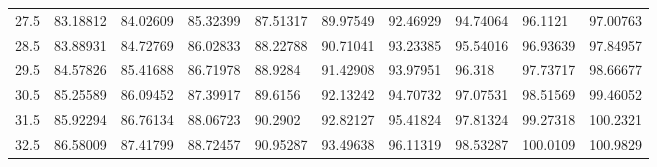 \documentclass[10pt,twocolumn,letterpaper]{article}
\begin{document}
\begin{table}
\begin{tabular}{llllllllll}
    27.5            & 83.18812                               & 84.02609                               & 85.32399                                & 87.51317                                & 89.97549                                & 92.46929                                & 94.74064                                & 96.1121                                 & 97.00763                                \\
    28.5            & 83.88931                               & 84.72769                               & 86.02833                                & 88.22788                                & 90.71041                                & 93.23385                                & 95.54016                                & 96.93639                                & 97.84957                                \\
    29.5            & 84.57826                               & 85.41688                               & 86.71978                                & 88.9284                                 & 91.42908                                & 93.97951                                & 96.318                                  & 97.73717                                & 98.66677                                \\
    30.5            & 85.25589                               & 86.09452                               & 87.39917                                & 89.6156                                 & 92.13242                                & 94.70732                                & 97.07531                                & 98.51569                                & 99.46052                                \\
    31.5            & 85.92294                               & 86.76134                               & 88.06723                                & 90.2902                                 & 92.82127                                & 95.41824                                & 97.81324                                & 99.27318                                & 100.2321                                \\
    32.5            & 86.58009                               & 87.41799                               & 88.72457                                & 90.95287                                & 93.49638                                & 96.11319                                & 98.53287                                & 100.0109                                & 100.9829                                \\

\end{tabular}
\end{table}
\end{document}
